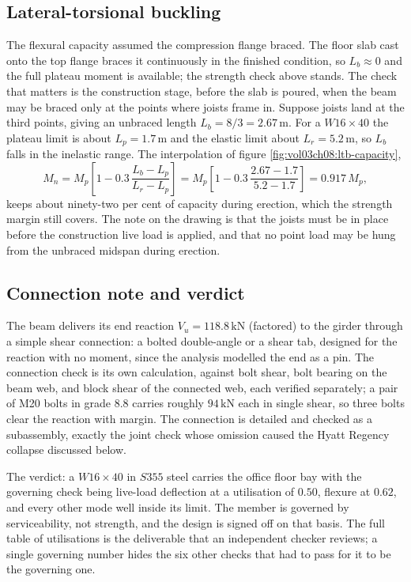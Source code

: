 \subsection{Lateral-torsional buckling}

The flexural capacity assumed the compression flange braced. The floor
slab cast onto the top flange braces it continuously in the finished
condition, so $L_b \approx 0$ and the full plateau moment is available;
the strength check above stands. The check that matters is the
construction stage, before the slab is poured, when the beam may be
braced only at the points where joists frame in. Suppose joists land at
the third points, giving an unbraced length $L_b = 8/3 = 2.67\,
\si{\meter}$. For a $W16\times 40$ the plateau limit is about $L_p =
1.7\,\si{\meter}$ and the elastic limit about $L_r = 5.2\,
\si{\meter}$, so $L_b$ falls in the inelastic range. The interpolation
of figure \ref{fig:vol03ch08:ltb-capacity},
\[
M_n = M_p\left[1 - 0.3\,\frac{L_b - L_p}{L_r - L_p}\right]
= M_p\left[1 - 0.3\,\frac{2.67 - 1.7}{5.2 - 1.7}\right]
= 0.917\,M_p,
\]
keeps about ninety-two per cent of capacity during erection, which the
strength margin still covers. The note on the drawing is that the
joists must be in place before the construction live load is applied,
and that no point load may be hung from the unbraced midspan during
erection.



\subsection{Connection note and verdict}

The beam delivers its end reaction $V_u = 118.8\,\text{kN}$ (factored)
to the girder through a simple shear connection: a bolted double-angle
or a shear tab, designed for the reaction with no moment, since the
analysis modelled the end as a pin. The connection check is its own
calculation, against bolt shear, bolt bearing on the beam web, and
block shear of the connected web, each verified separately; a pair of
M20 bolts in grade 8.8 carries roughly $94\,\text{kN}$ each in single
shear, so three bolts clear the reaction with margin. The connection is
detailed and checked as a subassembly, exactly the joint check whose
omission caused the Hyatt Regency collapse discussed below.

The verdict: a $W16\times 40$ in $S355$ steel carries the office floor
bay with the governing check being live-load deflection at a
utilisation of $0.50$, flexure at $0.62$, and every other mode well
inside its limit. The member is governed by serviceability, not
strength, and the design is signed off on that basis. The full table of
utilisations is the deliverable that an independent checker reviews; a
single governing number hides the six other checks that had to pass for
it to be the governing one.

